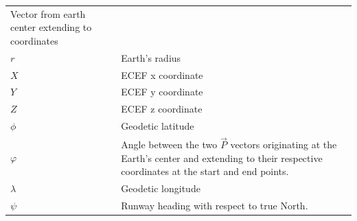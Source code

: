 \documentclass[
]{book}
\begin{document}
\begin{longtable}[]{@{}ll@{}}
\begin{minipage}[t]{0.51\columnwidth}
Vector from earth center extending to coordinates\strut
\end{minipage}\tabularnewline
\begin{minipage}[t]{0.43\columnwidth}\raggedright
\(r\)\strut
\end{minipage} & \begin{minipage}[t]{0.51\columnwidth}\raggedright
Earth's radius\strut
\end{minipage}\tabularnewline
\begin{minipage}[t]{0.43\columnwidth}\raggedright
\(X\)\strut
\end{minipage} & \begin{minipage}[t]{0.51\columnwidth}\raggedright
ECEF x coordinate\strut
\end{minipage}\tabularnewline
\begin{minipage}[t]{0.43\columnwidth}\raggedright
\(Y\)\strut
\end{minipage} & \begin{minipage}[t]{0.51\columnwidth}\raggedright
ECEF y coordinate\strut
\end{minipage}\tabularnewline
\begin{minipage}[t]{0.43\columnwidth}\raggedright
\(Z\)\strut
\end{minipage} & \begin{minipage}[t]{0.51\columnwidth}\raggedright
ECEF z coordinate\strut
\end{minipage}\tabularnewline
\begin{minipage}[t]{0.43\columnwidth}\raggedright
\(\phi\)\strut
\end{minipage} & \begin{minipage}[t]{0.51\columnwidth}\raggedright
Geodetic latitude\strut
\end{minipage}\tabularnewline
\begin{minipage}[t]{0.43\columnwidth}\raggedright
\(\varphi\)\strut
\end{minipage} & \begin{minipage}[t]{0.51\columnwidth}\raggedright
Angle between the two \(\overset{\rightarrow}{P}\) vectors originating at the Earth's center and extending to their respective coordinates at the start and end points.\strut
\end{minipage}\tabularnewline
\begin{minipage}[t]{0.43\columnwidth}\raggedright
\(\lambda\)\strut
\end{minipage} & \begin{minipage}[t]{0.51\columnwidth}\raggedright
Geodetic longitude\strut
\end{minipage}\tabularnewline
\begin{minipage}[t]{0.43\columnwidth}\raggedright
\(\psi\)\strut
\end{minipage} & \begin{minipage}[t]{0.51\columnwidth}\raggedright
Runway heading with respect to true North.\strut
\end{minipage}\tabularnewline
\bottomrule
\end{longtable}
\end{document}
